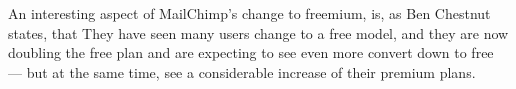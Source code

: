 An interesting aspect of MailChimp's change to freemium, is, as Ben Chestnut states, that  They have seen many users change to a free model, and they are now doubling the free plan and are expecting to see even more convert down to free --- but at the same time, see a considerable increase of their premium plans.

% 
% 
% 
% 
% 
% 
